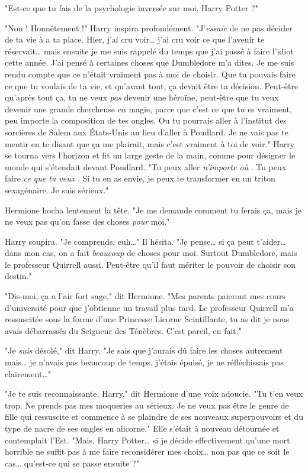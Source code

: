 "Est-ce que tu fais de la psychologie inversée sur moi, Harry Potter ?"

"Non ! Honnêtement !" Harry inspira profondément. "J'\emph{essaie}  de ne pas décider de ta vie à a ta place. Hier, j'ai cru voir… j'ai cru voir ce que l'avenir te réservait… mais ensuite je me suis rappelé du temps que j'ai passé à faire l'idiot cette année. J'ai pensé à certaines choses que Dumbledore m'a dites. Je me suis rendu compte que ce n'était vraiment pas à moi de choisir. Que tu pouvais faire ce que tu voulais de ta vie, et qu'avant tout, ça devait être ta décision. Peut-être qu'après tout ça, tu ne veux \emph{pas}  devenir une héroïne, peut-être que tu veux devenir une grande chercheuse en magie, parce que c'est ce que tu es vraiment, peu importe la composition de tes ongles. Ou tu pourrais aller à l'institut des sorcières de Salem aux États-Unis au lieu d'aller à Poudlard. Je ne vais pas te mentir en te disant que ça me plairait, mais c'est vraiment à toi de voir." Harry se tourna vers l'horizon et fit un large geste de la main, comme pour désigner le monde qui s'étendait devant Poudlard. "Tu peux aller \emph{n'importe où} . Tu peux faire \emph{ce que tu veux} . Si tu en as envie, je peux te transformer en un triton sexagénaire. Je suis sérieux."

Hermione hocha lentement la tête. "Je me demande comment tu ferais ça, mais je ne veux pas qu'on fasse des choses \emph{pour}  moi."

Harry soupira. "Je comprends. euh…" Il hésita. "Je pense… si ça peut t'aider… dans mon cas, on a fait \emph{beaucoup}  de choses pour moi. Surtout Dumbledore, mais le professeur Quirrell aussi. Peut-être qu'il faut mériter le pouvoir de choisir son destin."

"Dis-moi, ça a l'air fort sage," dit Hermione. "Mes parents paieront mes cours d'université pour que j'obtienne un travail plus tard. Le professeur Quirrell m'a ressuscitée sous la forme d'une Princesse Licorne Scintillante, tu as dit je nous avais débarrassés du Seigneur des Ténèbres. C'est pareil, en fait."

"Je \emph{suis}  désolé," dit Harry. "Je sais que j'aurais dû faire les choses autrement mais… je n'avais pas beaucoup de temps, j'étais épuisé, je ne réfléchissais pas clairement…"

"Je te suis reconnaissante, Harry," dit Hermione d'une voix adoucie. "Tu t'en veux trop. Ne prends pas mes moqueries au sérieux. Je ne veux pas être le genre de fille qui ressuscite et commence à se plaindre de ses nouveaux superpouvoirs et du type de nacre de ses ongles en alicorne." Elle s'était à nouveau détournée et contemplait l'Est. "Mais, Harry Potter… si je décide effectivement qu'une mort horrible ne suffit pas à me faire reconsidérer mes choix… non pas que ce soit le cas… qu'est-ce qui se passe ensuite ?"

